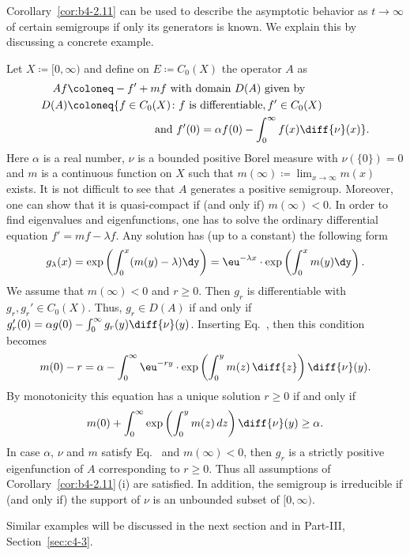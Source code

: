 Corollary~\ref{cor:b4-2.11} can be used to describe the asymptotic behavior as $t \to \infty$ of certain semigroups if only its generators is known. 
We explain this by discussing a concrete example.
\begin{example}\label{ex:b4-2.12}
	Let $X  \coloneq  [0,\infty)$ and define on $E  \coloneq  C_{0}(X)$ the operator $A$ as
	\begin{equation}\label{eq:b4-2.8}
		\begin{aligned}
		Af & \coloneq -f' + mf \text{ with domain } D(A) \text{ given by}	\\
		D(A) & \coloneq  \{f \in C_{0}(X) \colon f \text{ is differentiable}, f' \in C_{0}(X)\\
		& \phantom{aaaaaaaaaaaaaaa} \text{and } f'(0) = \alpha f(0) - \int_0^{\infty} f(x) \diff{\nu}(x)
 \} \text{.}
		\end{aligned}
	\end{equation}
Here $\alpha$ is a real number, $\nu$ is a bounded positive Borel measure with $\nu(\{0\}) = 0$ and $m$ is a continuous function on $X$ such that $m(\infty)  \coloneq  \lim_{x \to \infty}m(x)$ exists. 
It is not difficult to see that $A$ generates a positive semigroup. 
Moreover, one can show that it is quasi-compact if (and only if) $m(\infty) < 0$. 
In order to find eigenvalues and eigenfunctions, one has to solve the ordinary differential equation $f' = mf - \lambda f$. 
Any solution has (up to a constant) the following form
\begin{equation}\label{eq:b4-2.9}
	g_{\lambda}(x) = \exp\left(\int_0^x(m(y) - \lambda)\dy \right) = \eu^{-\lambda x} \cdot \exp\left(\int_0^x m(y) \dy \right) .
\end{equation}
We assume that $m(\infty) < 0$ and $r \geq 0$. 
Then $g_r$ is differentiable with $g_r, g_r' \in C_{0}(X)$. 
Thus, $g_r \in D(A)$ if and only if\/ $g_r'(0) = \alpha g(0) - \int_0^{\infty} g_r(y) \diff{\nu}(y)$. 
Inserting Eq.~, then this condition becomes
\[
m(0) - r = \alpha - \int_0^{\infty} \eu^{-ry} \cdot \exp\left(\int_{0}^{y}  m(z) \,\diff{z}\right)\diff{\nu}(y) .
\]
By monotonicity this equation has a unique solution $r \geq 0$ if and only if
\begin{equation}\label{eq:b4-2.10}
	m(0) + \int_0^{\infty} \exp\left(\int_0^y m(z) \, dz\right)\diff{\nu}(y) \geq \alpha .
\end{equation}
In case $\alpha$, $\nu$ and $m$ satisfy Eq.~ and $m(\infty) < 0$, then $g_r$ is a strictly positive eigenfunction of\/ $A$ corresponding to $r \geq 0$. 
Thus all assumptions of Corollary~\ref{cor:b4-2.11}\,(i) are satisfied. 
In addition, the semigroup is irreducible if (and only if) the support of\/ $\nu$ is an unbounded subset of\/ $[0,\infty)$.
\end{example}
Similar examples will be discussed in the next section and in  Part-III, Section~\ref{sec:c4-3}.

